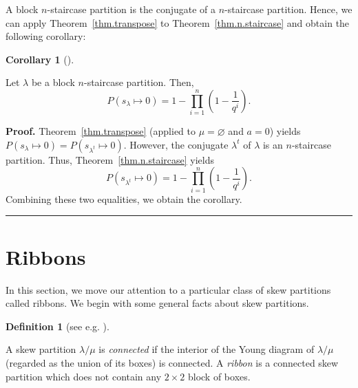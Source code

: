\documentclass[numbers=enddot,12pt,final,onecolumn,notitlepage]{scrartcl}%
\theoremstyle{definition}
\newtheorem{defi}[theo]{Definition}
\newenvironment{definition}[1][]
{\begin{defi}[#1]\begin{leftbar}}
{\end{leftbar}\end{defi}}
\newtheorem{coro}[theo]{Corollary}
\newenvironment{corollary}[1][]
{\begin{coro}[#1]\begin{leftbar}}
{\end{leftbar}\end{coro}}
\newtheorem{exam}[theo]{Example}
\newenvironment{example}[1][]
{\begin{exam}[#1]\begin{leftbar}}
{\end{leftbar}\end{exam}}
\newenvironment{proof}[1][Proof]{\noindent\textbf{#1.} }{\ \rule{0.5em}{0.5em}}
\let\prodnonlimits\prod
\renewcommand{\prod}{\prodnonlimits\limits}
\theoremstyle{plainsl}
\begin{document}
A block $n$-staircase partition is the conjugate of a $n$-staircase partition.
Hence, we can apply Theorem~\ref{thm.transpose} to Theorem~\ref{thm.n.staircase}
and obtain the following corollary:

\begin{corollary}
Let $\lambda$ be a block $n$-staircase partition. Then,
\[
P(s_{\lambda} \longmapsto 0) = 1-\prod_{i=1}^{n} \left(  1-\dfrac{1}{q^{i}}\right) .
\]
\end{corollary}

\begin{proof}
Theorem~\ref{thm.transpose} (applied to $\mu = \varnothing$
and $a = 0$) yields
$P\left(  s_{\lambda}\mapsto 0\right)
=P\left(  s_{\lambda^{t}}\mapsto 0\right)$.
However, the conjugate $\lambda^t$ of $\lambda$ is an $n$-staircase partition.
Thus, Theorem~\ref{thm.n.staircase}
yields
\[
P(s_{\lambda^t} \longmapsto 0) = 1-\prod_{i=1}^{n} \left(  1-\dfrac{1}{q^{i}}\right) .
\]
Combining these two equalities, we obtain the corollary.
\end{proof}

\section{Ribbons}

In this section, we move our attention to a particular class of skew partitions called ribbons. We begin with some general facts about skew partitions.

\begin{definition}[see e.g. {\cite[\S7.17]{EC2}}]

A skew partition $\lambda/\mu$ is \emph{connected} if the interior of the Young diagram of $\lambda/\mu$ (regarded as the union of its boxes) is connected.
A \emph{ribbon} is a connected skew partition which does not contain any $2 \times 2$ block of boxes. 

\end{definition}


\end{document}
